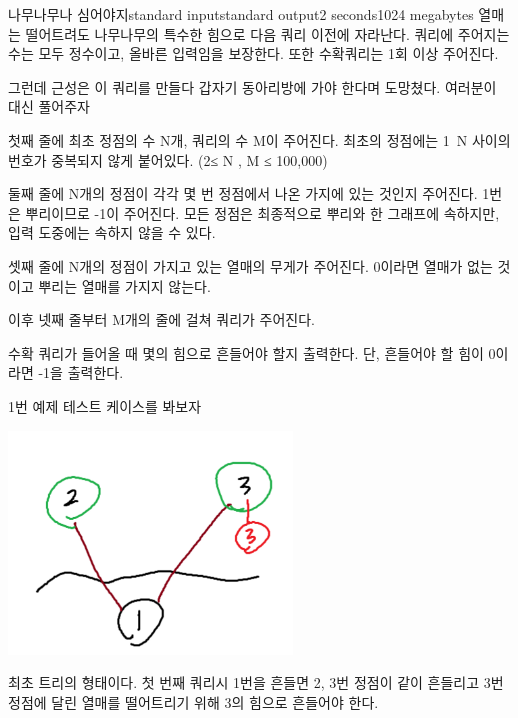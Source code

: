 \begin{problem}{나무나무나 심어야지}{standard input}{standard output}{2 seconds}{1024 megabytes}
열매는 떨어트려도 나무나무의 특수한 힘으로 다음 쿼리 이전에 자라난다.
쿼리에 주어지는 수는 모두 정수이고, 올바른 입력임을 보장한다. 또한 수확쿼리는 1회 이상 주어진다.


그런데 근성은 이 쿼리를 만들다 갑자기 동아리방에 가야 한다며 도망쳤다.
여러분이 대신 풀어주자

\InputFile
첫째 줄에 최초 정점의 수 N개, 쿼리의 수 M이 주어진다. 
최초의 정점에는 1~N 사이의 번호가 중복되지 않게 붙어있다. (2≤ N , M ≤ 100,000)

둘째 줄에 N개의 정점이 각각 몇 번 정점에서 나온 가지에 있는 것인지 주어진다.
1번은 뿌리이므로 -1이 주어진다.
모든 정점은 최종적으로 뿌리와 한 그래프에 속하지만, 입력 도중에는 속하지 않을 수 있다.

셋째 줄에 N개의 정점이 가지고 있는 열매의 무게가 주어진다. 0이라면 열매가 없는 것이고 뿌리는 열매를 가지지 않는다.

이후 넷째 줄부터 M개의 줄에 걸쳐 쿼리가 주어진다.

\OutputFile
수확 쿼리가 들어올 때 몇의 힘으로 흔들어야 할지 출력한다. 단, 흔들어야 할 힘이 0이라면 -1을 출력한다.

\Examples

\begin{example}
%
%
\end{example}

\Note
1번 예제 테스트 케이스를 봐보자

\begin{center}

\includegraphics[bb=0 0 100 200]{1img.png}

\end{center} 
최초 트리의 형태이다. 첫 번째 쿼리시 1번을 흔들면 2, 3번 정점이 같이 흔들리고 3번 정점에 달린 열매를 떨어트리기 위해 3의 힘으로 흔들어야 한다.

\begin{center}


\end{center}
\end{problem}
